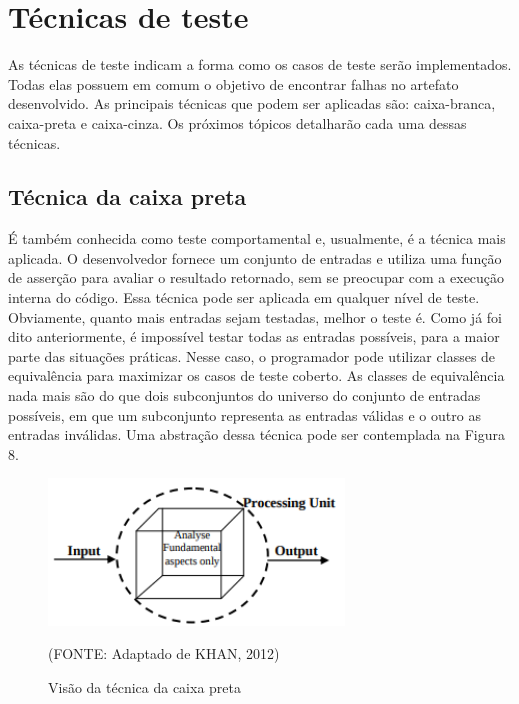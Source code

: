 \documentclass[
    12pt,       %
    openright,      %
    twoside,      %
    a4paper,      %
    english,      %
    french,       %
    spanish,      %
    brazil,       %
    ]{abntex2}
\begin{document}
      \section{Técnicas de teste}
          As técnicas de teste indicam a forma como os casos de teste serão implementados.
          Todas elas possuem em comum o objetivo de  encontrar falhas no artefato desenvolvido.
          As principais técnicas que podem ser aplicadas são: caixa-branca, caixa-preta e caixa-cinza.
          Os próximos tópicos detalharão cada uma dessas técnicas.

          \subsection{Técnica da caixa preta}
              É também conhecida como teste comportamental e, usualmente, é a técnica mais aplicada.
              O desenvolvedor fornece um conjunto de entradas e utiliza uma função de asserção
              para avaliar o resultado retornado, sem se preocupar com a execução interna do código.
              Essa técnica pode ser aplicada em qualquer nível de teste. Obviamente, quanto mais
              entradas sejam testadas, melhor o teste é. Como já foi dito anteriormente, é
              impossível testar todas as entradas possíveis, para a maior parte das situações práticas. Nesse caso, o programador pode utilizar
              classes de equivalência para maximizar os casos de teste coberto. As classes de equivalência
              nada mais são do que dois subconjuntos do universo do conjunto de entradas possíveis,
              em que um subconjunto representa as entradas válidas e o outro as entradas inválidas.
              Uma abstração dessa técnica pode ser contemplada na Figura 8.

              \begin{figure}[htbp]
                  \begin{center}
                      \includegraphics[width=0.7\textwidth]{img/blackbox.png}
                  \end{center}
              \caption{\label{fig:passaro}Visão da técnica da caixa preta}
              \begin{center}(FONTE: Adaptado de KHAN, 2012)\end{center}
              \end{figure}
\end{document}

